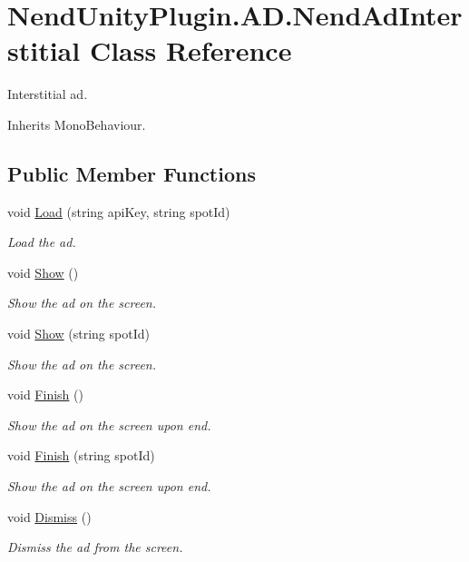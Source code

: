 \hypertarget{class_nend_unity_plugin_1_1_a_d_1_1_nend_ad_interstitial}{}\section{Nend\+Unity\+Plugin.\+A\+D.\+Nend\+Ad\+Interstitial Class Reference}
\label{class_nend_unity_plugin_1_1_a_d_1_1_nend_ad_interstitial}


Interstitial ad.  




Inherits Mono\+Behaviour.

\subsection*{Public Member Functions}
\begin{DoxyCompactItemize}
\item 
void \hyperlink{class_nend_unity_plugin_1_1_a_d_1_1_nend_ad_interstitial_ab940dfd39e691185d5759d55286c6767}{Load} (string api\+Key, string spot\+Id)
\begin{DoxyCompactList}\small\item\em Load the ad. \end{DoxyCompactList}\item 
void \hyperlink{class_nend_unity_plugin_1_1_a_d_1_1_nend_ad_interstitial_af8f301df5e5333278377d7522dcdde0e}{Show} ()
\begin{DoxyCompactList}\small\item\em Show the ad on the screen. \end{DoxyCompactList}\item 
void \hyperlink{class_nend_unity_plugin_1_1_a_d_1_1_nend_ad_interstitial_a6e9fab9bbe5f9683be96041c7f167f13}{Show} (string spot\+Id)
\begin{DoxyCompactList}\small\item\em Show the ad on the screen. \end{DoxyCompactList}\item 
void \hyperlink{class_nend_unity_plugin_1_1_a_d_1_1_nend_ad_interstitial_a966f5e7b8bfd6de2eeb9db1c0167ac35}{Finish} ()
\begin{DoxyCompactList}\small\item\em Show the ad on the screen upon end. \end{DoxyCompactList}\item 
void \hyperlink{class_nend_unity_plugin_1_1_a_d_1_1_nend_ad_interstitial_adf62f3370ef207ca9334b2db144ec0a3}{Finish} (string spot\+Id)
\begin{DoxyCompactList}\small\item\em Show the ad on the screen upon end. \end{DoxyCompactList}\item 
void \hyperlink{class_nend_unity_plugin_1_1_a_d_1_1_nend_ad_interstitial_ab90d53a7b479ff1a7156febc27ab0093}{Dismiss} ()
\begin{DoxyCompactList}\small\item\em Dismiss the ad from the screen. \end{DoxyCompactList}\end{DoxyCompactItemize}
